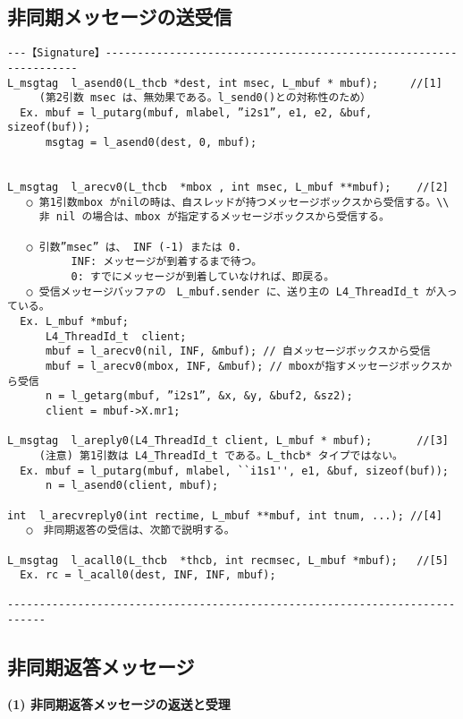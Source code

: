 \documentclass{jarticle}
\begin{document}
\subsection{非同期メッセージの送受信}

\begin{verbatim}
---【Signature】------------------------------------------------------------------
L_msgtag  l_asend0(L_thcb *dest, int msec, L_mbuf * mbuf);     //[1]
     (第2引数 msec は、無効果である。l_send0()との対称性のため）
  Ex. mbuf = l_putarg(mbuf, mlabel, ”i2s1”, e1, e2, &buf, sizeof(buf));
      msgtag = l_asend0(dest, 0, mbuf);


L_msgtag  l_arecv0(L_thcb  *mbox , int msec, L_mbuf **mbuf);    //[2]
   ○ 第1引数mbox がnilの時は、自スレッドが持つメッセージボックスから受信する。\\
     非 nil の場合は、mbox が指定するメッセージボックスから受信する。

   ○ 引数”msec” は、 INF (-1) または 0.
          INF: メッセージが到着するまで待つ。
          0: すでにメッセージが到着していなければ、即戻る。
   ○ 受信メッセージバッファの　L_mbuf.sender に、送り主の L4_ThreadId_t が入っている。
  Ex. L_mbuf *mbuf; 
      L4_ThreadId_t  client;
      mbuf = l_arecv0(nil, INF, &mbuf); // 自メッセージボックスから受信
      mbuf = l_arecv0(mbox, INF, &mbuf); // mboxが指すメッセージボックスから受信
      n = l_getarg(mbuf, ”i2s1”, &x, &y, &buf2, &sz2);
      client = mbuf->X.mr1;

L_msgtag  l_areply0(L4_ThreadId_t client, L_mbuf * mbuf);       //[3]
     (注意) 第1引数は L4_ThreadId_t である。L_thcb* タイプではない。
  Ex. mbuf = l_putarg(mbuf, mlabel, ``i1s1'', e1, &buf, sizeof(buf));
      n = l_asend0(client, mbuf);

int  l_arecvreply0(int rectime, L_mbuf **mbuf, int tnum, ...); //[4]
   ○　非同期返答の受信は、次節で説明する。

L_msgtag  l_acall0(L_thcb  *thcb, int recmsec, L_mbuf *mbuf);   //[5]
  Ex. rc = l_acall0(dest, INF, INF, mbuf);

----------------------------------------------------------------------------
\end{verbatim}


\subsection{非同期返答メッセージ}

{\flushleft\bf (1) 非同期返答メッセージの返送と受理}
\end{document}
